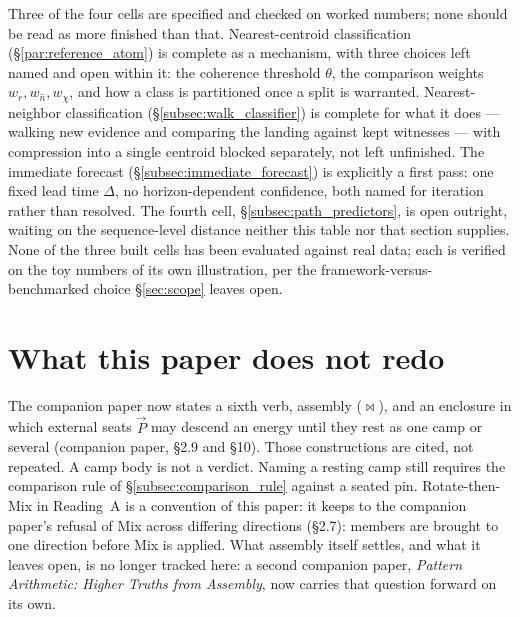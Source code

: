 \documentclass[12pt, a4paper]{article}
\begin{document}
Three of the four cells are specified and checked on worked numbers;
none should be read as more finished than that. Nearest-centroid
classification (\S\ref{par:reference_atom}) is complete as a
mechanism, with three choices left named and open within it: the
coherence threshold $\theta$, the comparison weights
$w_r,w_{\hat n},w_\chi$, and how a class is partitioned once a split
is warranted. Nearest-neighbor classification
(\S\ref{subsec:walk_classifier}) is complete for what it does ---
walking new evidence and comparing the landing against kept
witnesses --- with compression into a single centroid blocked
separately, not left unfinished. The immediate forecast
(\S\ref{subsec:immediate_forecast}) is explicitly a first pass: one
fixed lead time $\Delta$, no horizon-dependent confidence, both named
for iteration rather than resolved. The fourth cell,
\S\ref{subsec:path_predictors}, is open outright, waiting on the
sequence-level distance neither this table nor that section
supplies. None of the three built cells has been evaluated against
real data; each is verified on the toy numbers of its own
illustration, per the framework-versus-benchmarked choice
\S\ref{sec:scope} leaves open.


\section{What this paper does not redo}
\label{sec:not_redo}

The companion paper now states a sixth verb, assembly ($\bowtie$),
and an enclosure in which external seats $\vec P$ may descend an
energy until they rest as one camp or several
(companion paper, \S2.9 and \S10). Those
constructions are cited, not repeated. A camp body is not a verdict.
Naming a resting camp still requires the comparison rule of
\S\ref{subsec:comparison_rule} against a seated pin. Rotate-then-Mix
in Reading~A is a convention of this paper: it keeps to the companion paper's refusal of Mix across differing directions (\S2.7): members are
brought to one direction before Mix is applied. What
assembly itself settles, and what it leaves open, is no longer
tracked here: a second companion paper, \emph{Pattern Arithmetic:
Higher Truths from Assembly}, now carries that question forward on
its own.
\end{document}
